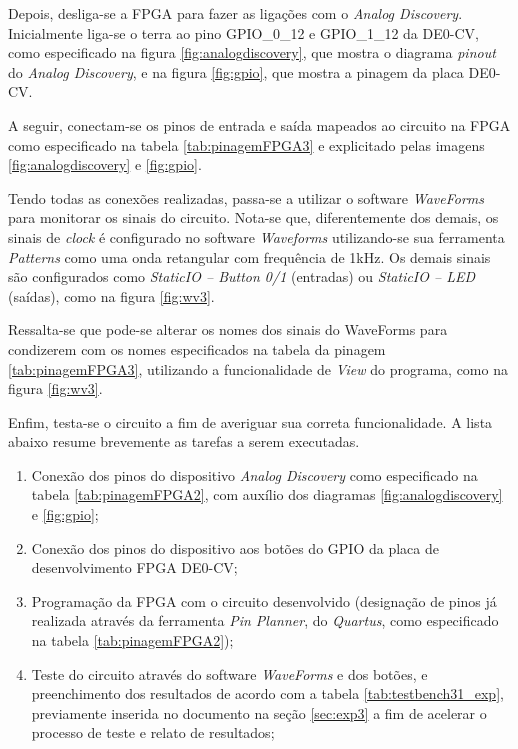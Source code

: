 \documentclass[amsmath,amssymb,floatfix]{report}
\begin{document}
Depois, desliga-se a FPGA para fazer as ligações com o \textit{Analog Discovery}. Inicialmente liga-se o terra ao pino GPIO\_0\_12 e GPIO\_1\_12 da DE0-CV, como especificado na figura \ref{fig:analogdiscovery}, que mostra o diagrama \textit{pinout} do \textit{Analog Discovery}, e na figura \ref{fig:gpio}, que mostra a pinagem da placa DE0-CV.

A seguir, conectam-se os pinos de entrada e saída mapeados ao circuito na FPGA como especificado na tabela \ref{tab:pinagemFPGA3} e explicitado pelas imagens \ref{fig:analogdiscovery} e \ref{fig:gpio}.

Tendo todas as conexões realizadas, passa-se a utilizar o software \textit{WaveForms} para monitorar os sinais do circuito. Nota-se que, diferentemente dos demais, os sinais de \textit{clock} é configurado no software \textit{Waveforms} utilizando-se sua ferramenta \textit{Patterns} como uma onda retangular com frequência de 1kHz. Os demais sinais são configurados como \textit{StaticIO -- Button 0/1} (entradas) ou \textit{StaticIO -- LED} (saídas), como na figura \ref{fig:wv3}.

Ressalta-se que pode-se alterar os nomes dos sinais do WaveForms para condizerem com os nomes especificados na tabela da pinagem \ref{tab:pinagemFPGA3}, utilizando a funcionalidade de \textit{View} do programa, como na figura \ref{fig:wv3}.

Enfim, testa-se o circuito a fim de averiguar sua correta funcionalidade. A lista abaixo resume brevemente as tarefas a serem executadas.

\begin{enumerate}
    \item Conexão dos pinos do dispositivo \textit{Analog Discovery} como especificado na tabela \ref{tab:pinagemFPGA2}, com auxílio dos diagramas \ref{fig:analogdiscovery} e \ref{fig:gpio};
    \item Conexão dos pinos do dispositivo aos botões do GPIO da placa de desenvolvimento FPGA DE0-CV;
    \item Programação da FPGA com o circuito desenvolvido (designação de pinos já realizada através da ferramenta \textit{Pin Planner}, do \textit{Quartus}, como especificado na tabela \ref{tab:pinagemFPGA2});
    \item Teste do circuito através do software \textit{WaveForms} e dos botões, e preenchimento dos resultados de acordo com a tabela \ref{tab:testbench31_exp}, previamente inserida no documento na seção \ref{sec:exp3} a fim de acelerar o processo de teste e relato de resultados;
\end{enumerate}
\end{document}
